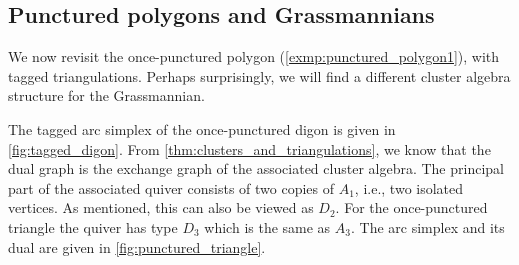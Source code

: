 \subsection{Punctured polygons and Grassmannians}\label{sec:punctured_polygon}

We now revisit the once-punctured polygon (\cref{exmp:punctured_polygon1}), with tagged
triangulations. Perhaps surprisingly, we will find a different cluster algebra
structure for the Grassmannian.

\medskip

The tagged arc simplex of the once-punctured digon is given in \cref{fig:tagged_digon}.
From \cref{thm:clusters_and_triangulations}, we know that the dual graph is the
exchange graph of the associated cluster algebra. The principal part of the associated
quiver consists of two copies of $A_1$, i.e., two isolated vertices. As mentioned, this
can also be viewed as $D_2$. For the once-punctured triangle the quiver has type $D_3$
which is the same as $A_3$. The arc simplex and its dual are given in
\cref{fig:punctured_triangle}.

